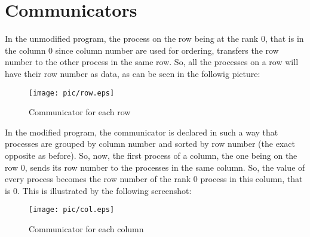 \chapter{Communicators}

In the unmodified program, the process on the row being at the rank 0, that is in the column 0 since column number are used for ordering, transfers the row number to the other process in the same row. So, all the processes on a row will have their row number as data, as can be seen in the followig picture:
\begin{figure}[!h]
\begin{center}
	\texttt{[image: pic/row.eps]}
	\caption{Communicator for each row}
\end{center}
\end{figure}

In the modified program, the communicator is declared in such a way that processes are grouped by column number and sorted by row number (the exact opposite as before). So, now, the first process of a column, the one being on the row 0, sends its row number to the processes in the same column. So, the value of every process becomes the row number of the rank 0 process in this column, that is 0. This is illustrated by the following screenshot:
\begin{figure}[!h]
\begin{center}
	\texttt{[image: pic/col.eps]}
	\caption{Communicator for each column}
\end{center}
\end{figure}

